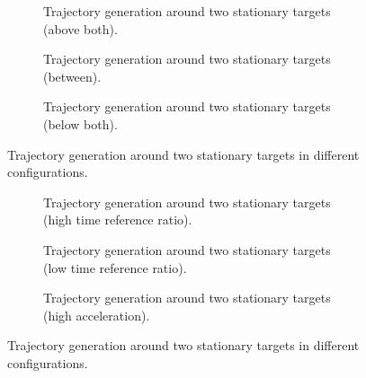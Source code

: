 \begin{figure}
    \centering
    \begin{subfigure}[b]{\textwidth}
        \centering
        
        \caption{Trajectory generation around two stationary targets (above both).}
        \label{fig:stationary-target-2}
    \end{subfigure}
    \hfill
    \begin{subfigure}[b]{\textwidth}
        \centering
        
        \caption{Trajectory generation around two stationary targets (between).}
        \label{fig:stationary-target-3}
    \end{subfigure}
    \hfill
    \begin{subfigure}[b]{\textwidth}
        \centering
        
        \caption{Trajectory generation around two stationary targets (below both).}
        \label{fig:stationary-target-4}
    \end{subfigure}
    \caption{Trajectory generation around two stationary targets in different configurations.}
    \label{fig:stationary-targets-subfigures}
\end{figure}


\begin{figure}
    \centering
    \begin{subfigure}[b]{\textwidth}
        \centering
        
        \caption{Trajectory generation around two stationary targets (high time reference ratio).}
        \label{fig:stationary-target-5}
    \end{subfigure}
    \hfill
    \begin{subfigure}[b]{\textwidth}
        \centering
        
        \caption{Trajectory generation around two stationary targets (low time reference ratio).}
        \label{fig:stationary-target-6}
    \end{subfigure}
    \hfill
    \begin{subfigure}[b]{\textwidth}
        \centering
        
        \caption{Trajectory generation around two stationary targets (high acceleration).}
        \label{fig:stationary-target-7}
    \end{subfigure}
    \caption{Trajectory generation around two stationary targets in different configurations.}
    \label{fig:stationary-targets-subfigures-2}
\end{figure}


